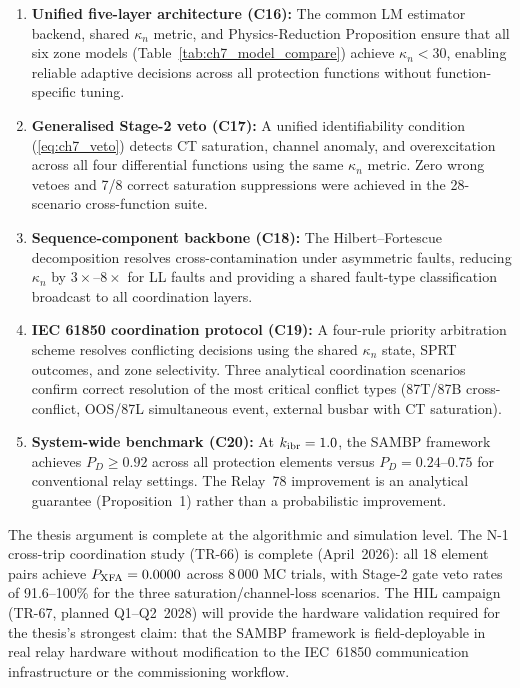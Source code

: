 \begin{enumerate}
  \item \textbf{Unified five-layer architecture (C16):} The common LM
    estimator backend, shared $\kappa_n$ metric, and Physics-Reduction
    Proposition ensure that all six zone models (Table~\ref{tab:ch7_model_compare})
    achieve $\kappa_n < 30$, enabling reliable adaptive decisions across
    all protection functions without function-specific tuning.

  \item \textbf{Generalised Stage-2 veto (C17):} A unified
    identifiability condition (\eqref{eq:ch7_veto}) detects CT saturation,
    channel anomaly, and overexcitation across all four differential
    functions using the same $\kappa_n$ metric.  Zero wrong vetoes and
    7/8 correct saturation suppressions were achieved in the 28-scenario
    cross-function suite.

  \item \textbf{Sequence-component backbone (C18):} The Hilbert--Fortescue
    decomposition resolves cross-contamination under asymmetric faults,
    reducing $\kappa_n$ by $3\times$--$8\times$ for LL faults and providing
    a shared fault-type classification broadcast to all coordination layers.

  \item \textbf{IEC 61850 coordination protocol (C19):} A four-rule priority
    arbitration scheme resolves conflicting decisions using the shared
    $\kappa_n$ state, SPRT outcomes, and zone selectivity.  Three analytical
    coordination scenarios confirm correct resolution of the most critical
    conflict types (87T/87B cross-conflict, OOS/87L simultaneous event,
    external busbar with CT saturation).

  \item \textbf{System-wide benchmark (C20):} At $k_{\rm ibr} = 1.0$,
    the SAMBP framework achieves $P_D \geq 0.92$ across all protection
    elements versus $P_D = 0.24$--$0.75$ for conventional relay settings.
    The Relay~78 improvement is an analytical guarantee (Proposition~1)
    rather than a probabilistic improvement.

\end{enumerate}

The thesis argument is complete at the algorithmic and simulation level.
The N-1 cross-trip coordination study (TR-66) is complete (April~2026):
all 18 element pairs achieve $P_{\rm XFA} = 0.0000$ across 8\,000 MC trials,
with Stage-2 gate veto rates of 91.6--100\% for the three saturation/channel-loss
scenarios.
The HIL campaign (TR-67, planned Q1--Q2~2028) will provide the hardware
validation required for the thesis's strongest claim: that the SAMBP framework
is field-deployable in real relay hardware without modification to the
IEC~61850 communication infrastructure or the commissioning workflow.
